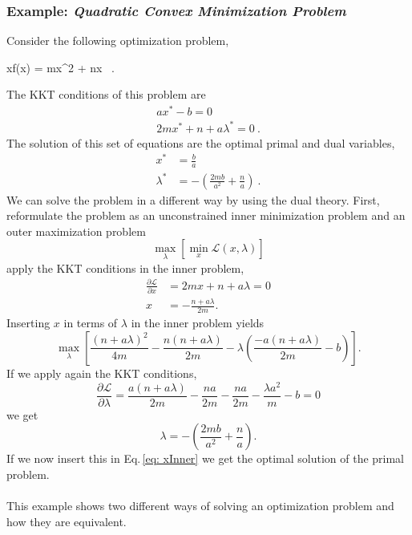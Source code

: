 \subsubsection{Example: \textit{Quadratic Convex Minimization Problem}}
Consider the following optimization problem,
\begin{mini!}[2]
	{x}{f(x) = mx^{2} + nx}{}{}{\quad {}}
	\ .
\end{mini!}
The KKT conditions of this problem are
\begin{align}
    ax^{*}-b=0 \\
    2mx^{*}+n + a\lambda^{*}= 0\ .
\end{align}
The solution of this set of equations are the optimal primal and dual variables,
\begin{align}
    x^{*} &= \frac{b}{a} \\
    \lambda^{*} &= - \left(\frac{2mb}{a^{2}} + \frac{n}{a}\right)\ .
\end{align}
We can solve the problem in a different way by using the dual theory. First, reformulate the problem as an unconstrained inner minimization problem and an outer maximization problem
\begin{equation}
    \max_{\lambda}\left[\min_{x}\mathcal{L}(x,\lambda)\right]
\end{equation}
apply the KKT conditions in the inner problem,
\begin{align}
    \frac{\partial \mathcal{L}}{\partial x} &= 2mx + n + a\lambda = 0 \\
    x &= - \frac{n + a\lambda}{2m}\label{eq: xInner}.
\end{align}
Inserting $x$ in terms of $\lambda$ in the inner problem yields
\begin{equation}
    \max_{\lambda} \left[\frac{(n+a\lambda)^{2}}{4m} - \frac{n(n+a\lambda)}{2m} - \lambda\left(\frac{-a(n+a\lambda)}{2m} - b\right)\right].
\end{equation}
If we apply again the KKT conditions,
\begin{equation}
    \frac{\partial \mathcal{L}}{\partial \lambda} = \frac{a(n + a\lambda)}{2m} - \frac{na}{2m} - \frac{na}{2m} - \frac{\lambda a^{2}}{m} - b = 0
\end{equation}
we get
\begin{equation}
    \lambda = - \left(\frac{2mb}{a^{2}} + \frac{n}{a}\right).
\end{equation}
If we now insert this in Eq.\,\eqref{eq: xInner} we get the optimal solution of the primal problem.\\\\
This example shows two different ways of solving an optimization problem and how they are equivalent.
